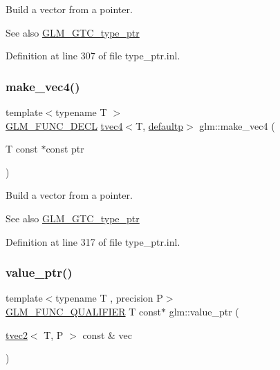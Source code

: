 Build a vector from a pointer. \begin{DoxySeeAlso}{See also}
\mbox{\hyperlink{group__gtc__type__ptr}{G\+L\+M\+\_\+\+G\+T\+C\+\_\+type\+\_\+ptr}} 
\end{DoxySeeAlso}


Definition at line 307 of file type\+\_\+ptr.\+inl.

\mbox{\label{group__gtc__type__ptr_ga152345176b8951c15711f6ed4f6fc237}} 
\subsubsection{\texorpdfstring{make\_vec4()}{make\_vec4()}}
{\footnotesize\ttfamily template$<$typename T $>$ \\
\mbox{\hyperlink{setup_8hpp_ab2d052de21a70539923e9bcbf6e83a51}{G\+L\+M\+\_\+\+F\+U\+N\+C\+\_\+\+D\+E\+CL}} \mbox{\hyperlink{structglm_1_1tvec4}{tvec4}}$<$T, \mbox{\hyperlink{namespaceglm_a0f04f086094c747d227af4425893f545a9d21ccd8b5a009ec7eb7677befc3bf51}{defaultp}}$>$ glm\+::make\+\_\+vec4 (\begin{DoxyParamCaption}\item[{T const $\ast$const}]{ptr }\end{DoxyParamCaption})}

Build a vector from a pointer. \begin{DoxySeeAlso}{See also}
\mbox{\hyperlink{group__gtc__type__ptr}{G\+L\+M\+\_\+\+G\+T\+C\+\_\+type\+\_\+ptr}} 
\end{DoxySeeAlso}


Definition at line 317 of file type\+\_\+ptr.\+inl.

\mbox{\label{group__gtc__type__ptr_gafb01331238d8899dde700cb9b5dc6ef3}} 
\subsubsection{\texorpdfstring{value\_ptr()}{value\_ptr()}\hspace{0.1cm}{\footnotesize\ttfamily [1/27]}}
{\footnotesize\ttfamily template$<$typename T , precision P$>$ \\
\mbox{\hyperlink{setup_8hpp_a33fdea6f91c5f834105f7415e2a64407}{G\+L\+M\+\_\+\+F\+U\+N\+C\+\_\+\+Q\+U\+A\+L\+I\+F\+I\+ER}} T const$\ast$ glm\+::value\+\_\+ptr (\begin{DoxyParamCaption}\item[{\mbox{\hyperlink{structglm_1_1tvec2}{tvec2}}$<$ T, P $>$ const \&}]{vec }\end{DoxyParamCaption})}

